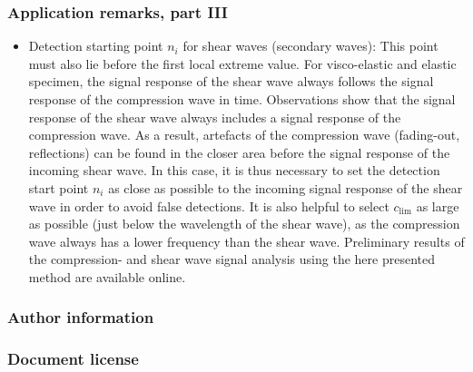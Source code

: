 \documentclass[11pt,aspectratio=169]{beamer}
\def\PresCopyrightType{ccby} %
\begin{document}
	\begin{frame}
		\frametitle{\appendixname{} \textendash{} Application remarks, part III}
		\begin{itemize}
			\item Detection starting point $n_i$ for shear waves (secondary waves): This point must also lie before the first local extreme value. For visco-elastic and elastic specimen, the signal response of the shear wave always follows the signal response of the compression wave in time. Observations show that the signal response of the shear wave always includes a signal response of the compression wave. As a result, artefacts of the compression wave (fading-out, reflections) can be found in the closer area before the signal response of the incoming shear wave. In this case, it is thus necessary to set the detection start point $n_i$ as close as possible to the incoming signal response of the shear wave in order to avoid false detections. It is also helpful to select $c_{\lim}$ as large as possible (just below the wavelength of the shear wave), as the compression wave always has a lower frequency than the shear wave. Preliminary results of the compression- and shear wave signal analysis using the here presented method are available online\cite{prelimresultspaper3}.
		\end{itemize}
	\end{frame}
	\begin{frame}[noframenumbering]
		\frametitle{\appendixname{} \textendash{} Author information}
		\RIPauthorinfo{}
	\end{frame}
	\begin{frame}[noframenumbering]
		\frametitle{\appendixname{} \textendash{} Document license}
		\expandafter\RIPcopyrightinfo\expandafter{\PresCopyrightType}
	\end{frame}
\end{document}
